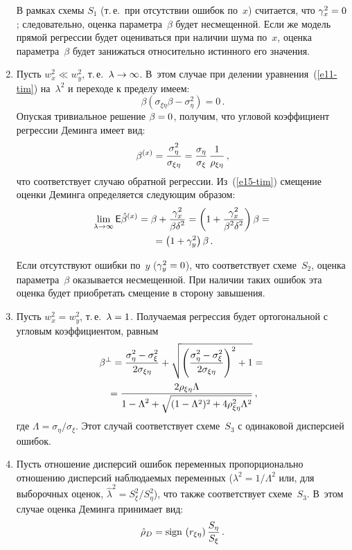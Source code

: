 \begin{multicols}{2}
\begin{enumerate}[1.]
  В рамках схемы $S_1$ (т.\,е.\ при отсутствии ошибок по~$x$) считается,
что $\gamma_x^2\hm=0$; следовательно, оценка параметра~$\beta$ будет
несмещенной. Если же модель прямой регрессии будет оцениваться при
наличии шума по~$x$, оценка параметра~$\beta$ будет занижаться
относительно истинного его значения.
\item Пусть $w_x^2\ll w_y^2$, т.\,е.\ $\lambda\hm\to \infty$. В~этом случае
при делении уравнения~(\ref{e11-tim}) на~$\lambda^2$ и переходе к
пределу имеем:
$$
\beta \left( \sigma_{\xi\eta}\beta - \sigma_\eta^2\right) =0\,.
$$
Опуская тривиальное решение $\beta\hm=0$, получим, что угловой
коэффициент регрессии Деминга имеет вид:
\begin{equation}
\beta^{(x)} =\displaystyle\frac{\displaystyle \sigma^2_\eta\mathstrut}{\displaystyle \sigma_{\xi\eta}\mathstrut}=\displaystyle\frac{\displaystyle \sigma_\eta\mathstrut}{\displaystyle \sigma_\xi\mathstrut}\,
\displaystyle\frac{\displaystyle 1\mathstrut}{\displaystyle \rho_{\xi\eta}\mathstrut}\,,
\label{e15-tim}
\end{equation}
что соответствует случаю обратной регрессии. Из~(\ref{e15-tim}) смещение
оценки Деминга определяется следующим образом:
\begin{multline*}
\lim\limits_{\lambda\to\infty} {\sf E} \hat{\beta}^{(x)} = \beta
+\displaystyle\frac{\displaystyle \gamma_x^2\mathstrut}{\displaystyle \beta\delta^2\mathstrut} = \left( 1+\displaystyle\frac{\displaystyle \gamma_x^2\mathstrut}{\displaystyle \beta^2\delta^2\mathstrut}
\right) \beta ={}\\
{}=\left(1+\gamma_y^2\right) \beta\,.
\end{multline*}

  Если отсутствуют ошибки по~$y$ ($\gamma_y^2\hm=0$), что
соответствует схеме~$S_2$, оценка параметра~$\beta$ оказывается
несмещенной. При наличии таких ошибок эта оценка будет приобретать
смещение в сторону завышения.
\item Пусть $w_x^2=w_y^2$, т.\,е.\ $\lambda\hm=1$. Получаемая регрессия
будет ортогональной с угловым коэффициентом, равным
\begin{multline}
\beta^\perp = \displaystyle\frac{\displaystyle \sigma_\eta^2-\sigma_\xi^2\mathstrut}{\displaystyle 2\sigma_{\xi\eta}\mathstrut} +
\sqrt{\left(\displaystyle\frac{\displaystyle \sigma_\eta^2-\sigma_\xi^2\mathstrut}{\displaystyle 2\sigma_{\xi\eta}\mathstrut}\right)^2+1}={}\\
{}=
\displaystyle\frac{\displaystyle 2\rho_{\xi\eta}\Lambda\mathstrut}{\displaystyle 1-\Lambda^2 +\sqrt{(1-\Lambda^2)^2
+4\rho^2_{\xi\eta} \Lambda^2}\mathstrut}\,,
\label{e16-tim}
\end{multline}
где $\Lambda=\sigma_\eta/\sigma_\xi$. Этот случай соответствует
схеме~$S_3$ с одинаковой дисперсией ошибок.
\item Пусть отношение дисперсий ошибок переменных пропорционально
отношению дисперсий наблюдаемых переменных
($\lambda^2=1/\Lambda^2$ или, для выборочных оценок, $\hat{\lambda}^2
=S^2_\xi/S^2_\eta$), что также соответствует схеме~$S_3$. В~этом случае
оценка Деминга принимает вид:
\begin{equation}
\hat{\rho}_D =\mathrm{sign}\, \left( r_{\xi\eta}\right) \displaystyle\frac{\displaystyle S_\eta\mathstrut}{\displaystyle S_\xi\mathstrut}\,.
\label{e17-tim}
\end{equation}


\end{enumerate}
\end{multicols}
